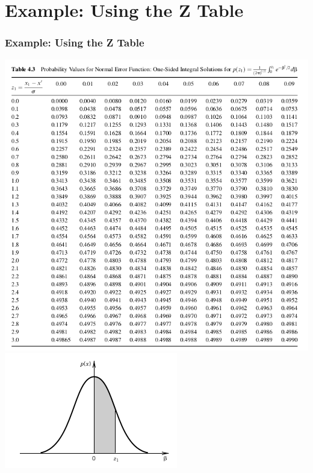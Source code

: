 \documentclass[fleqn]{beamer} %
\newcommand{\sectiontitleIV}{Example: Using the Z Table}
\begin{document}
\section{\sectiontitleIV}	
	\begin{frame}[label=sectionIV] \small
		\frametitle{\sectiontitleIV}    

		\includegraphics[scale=.25]{topic2_fig2.png}	
		\includegraphics[scale=.45]{topic2_fig3.png}	

	\end{frame}
\end{document}
